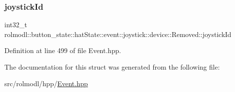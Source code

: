 \subsubsection{\texorpdfstring{joystickId}{joystickId}}
{\footnotesize\ttfamily int32\+\_\+t rolmodl\+::button\+\_\+state\+::hat\+State\+::event\+::joystick\+::device\+::\+Removed\+::joystick\+Id}



Definition at line 499 of file Event.\+hpp.



The documentation for this struct was generated from the following file\+:\begin{DoxyCompactItemize}
\item 
src/rolmodl/hpp/\mbox{\hyperlink{_event_8hpp}{Event.\+hpp}}\end{DoxyCompactItemize}
